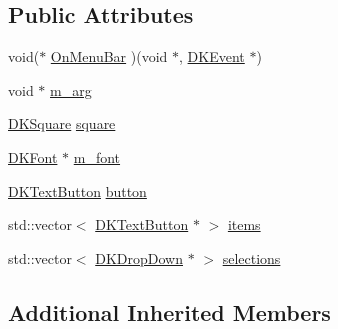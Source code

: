 \subsection*{Public Attributes}
\begin{DoxyCompactItemize}
\item 
void($\ast$ \hyperlink{class_d_k_menu_bar_a7e6412c179f238cd0d679b88a1a76efa}{On\-Menu\-Bar} )(void $\ast$, \hyperlink{class_d_k_event}{D\-K\-Event} $\ast$)
\item 
void $\ast$ \hyperlink{class_d_k_menu_bar_a93fe37e8aa8593c82b532d897436ce4b}{m\-\_\-arg}
\item 
\hyperlink{class_d_k_square}{D\-K\-Square} \hyperlink{class_d_k_menu_bar_a06f2eec8dc05bdc01429a5a76d8d283d}{square}
\item 
\hyperlink{class_d_k_font}{D\-K\-Font} $\ast$ \hyperlink{class_d_k_menu_bar_a53551d557413ec77ff8e6309bbb69713}{m\-\_\-font}
\item 
\hyperlink{class_d_k_text_button}{D\-K\-Text\-Button} \hyperlink{class_d_k_menu_bar_ad8d1d50f649ca014a8b06bde77cec593}{button}
\item 
std\-::vector$<$ \hyperlink{class_d_k_text_button}{D\-K\-Text\-Button} $\ast$ $>$ \hyperlink{class_d_k_menu_bar_a3dc201baa093589c9f9245308b82760e}{items}
\item 
std\-::vector$<$ \hyperlink{class_d_k_drop_down}{D\-K\-Drop\-Down} $\ast$ $>$ \hyperlink{class_d_k_menu_bar_a421a12e43dec97ae6262997fce27dbcd}{selections}
\end{DoxyCompactItemize}
\subsection*{Additional Inherited Members}


